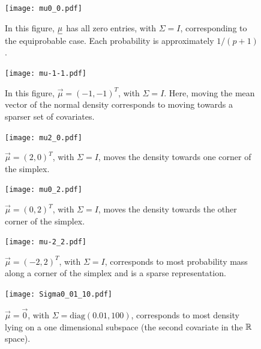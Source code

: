 \begin{figure}[ht]
\begin{minipage}[b]{0.45\linewidth}
\centering
\texttt{[image: mu0\_0.pdf]}
\caption[ALN plot with a zero mean vector.]{In this figure, $\underline{\mu}$ has all zero entries, with $\Sigma=I$, corresponding to the equiprobable case. Each probability is approximately $1/(p+1)$. }
\label{fig:figure9}
\end{minipage}
\hspace{0.5cm}
\begin{minipage}[b]{0.45\linewidth}
\centering

\texttt{[image: mu-1-1.pdf]}
\caption[ALN plot with a negative one mean vector.]{In this figure, $\vec{\mu}=(-1,-1)^T$, with $\Sigma=I$. Here, moving the mean vector of the normal density  corresponds to moving towards a sparser set of covariates. }
\label{fig:figure10}
\end{minipage}
\end{figure}

\begin{figure}[ht]
\begin{minipage}[b]{0.45\linewidth}
\centering
\texttt{[image: mu2\_0.pdf]}
\caption[ALN plot with a mean vector $(2,0)^{T}$.]{$\vec{\mu}=(2,0)^T$, with $\Sigma=I$, moves the density towards one corner of the simplex. }
\label{fig:figure1}
\end{minipage}
\hspace{0.5cm}
\begin{minipage}[b]{0.45\linewidth}
\centering
\texttt{[image: mu0\_2.pdf]}
\caption[ALN plot with mean vector $(2,0)^{T}$.]{$\vec{\mu}=(0,2)^T$, with $\Sigma=I$, moves the density towards the other corner of the simplex. }
\label{fig:figur2}
\end{minipage}
\end{figure}

\begin{figure}[ht]
\begin{minipage}[b]{0.45\linewidth}
\centering
\texttt{[image: mu-2\_2.pdf]}
\caption[ALN plot with a mean vector of $(-2,2)^{T}$.]{$\vec{\mu}=(-2,2)^T$, with $\Sigma=I$, corresponds to most probability mass along a corner of the simplex and is a sparse representation.} 
\label{fig:figure3}
\end{minipage}
\hspace{0.5cm}
\begin{minipage}[b]{0.45\linewidth}
\centering
\texttt{[image: Sigma0\_01\_10.pdf]}
\caption[ALN plot $\Sigma=\text{Diag(0.01,100)}$.]{ $\vec{\mu}=\vec{0}$, with
 $\Sigma= \text{diag}(0.01, 100)$, corresponds to most density lying on a one dimensional subspace (the second covariate in the $\mathbb{R}^{\ }$ space).  }
\label{fig:figure4}
\end{minipage}
\end{figure}


